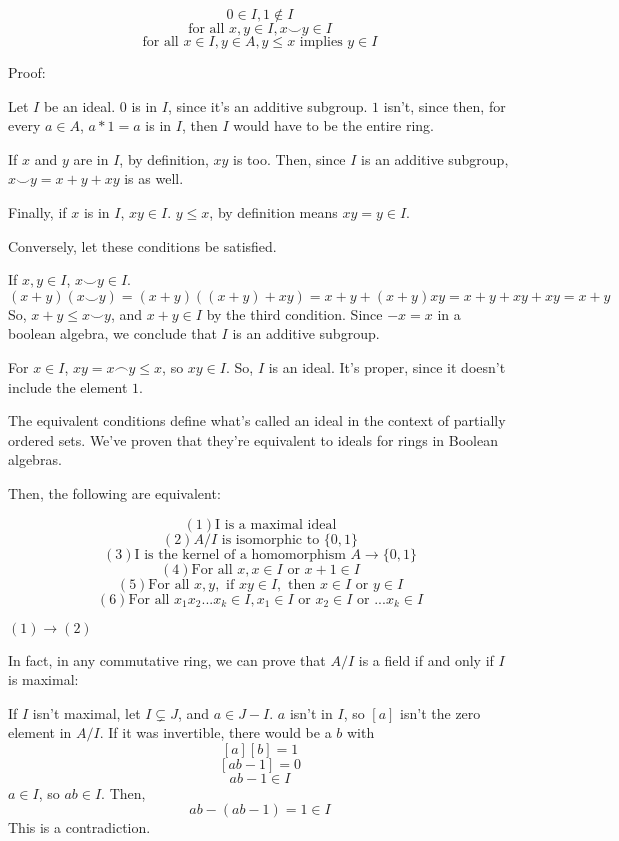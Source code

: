 \documentclass{article}
\begin{document}
      \[0 \in I, 1 \notin I\]
      \[\text{for all } x, y \in I, x \smile y \in I\]
      \[\text{for all } x \in I, y \in A, y \leq x \text{ implies } y \in I\]

      Proof:
      
      Let $I$ be an ideal. $0$ is in $I$, since it's an additive subgroup. $1$
      isn't, since then, for every $a \in A$, $a*1 = a$ is in $I$, then $I$
      would have to be the entire ring.

      If $x$ and $y$ are in $I$, by definition, $xy$ is too. Then, since $I$ is
      an additive subgroup, $x \smile y = x + y + xy$ is as well.

      Finally, if $x$ is in $I$, $xy \in I$. $y \leq x$, by definition means
      $xy = y \in I$.

      Conversely, let these conditions be satisfied.

      If $x, y \in I$, $x \smile y \in I$.
      \[(x+y)(x \smile y) = (x+y)((x+y)+xy) = x + y + (x+y)xy = x + y + xy + xy =
      x + y\]
      So, $x+y \leq x \smile y$, and $x+y \in I$ by the third condition. Since
      $-x = x$ in a boolean algebra, we conclude that $I$ is an additive
      subgroup.

      For $x \in I$, $xy = x \frown y \leq x$, so $xy \in I$. So, $I$ is an
      ideal. It's proper, since it doesn't include the element $1$.

      The equivalent conditions define what's called an ideal in the context of
      partially ordered sets. We've proven that they're equivalent to ideals for
      rings in Boolean algebras.

      Then, the following are equivalent:

      \[(1) \text{I is a maximal ideal}\]
      \[(2) A/I \text{ is isomorphic to } \{0,1\}\]
      \[(3) \text{I is the kernel of a homomorphism } A \rightarrow \{0,1\}\]
      \[(4) \text{For all } x, x \in I \text{ or } x+1 \in I\]
      \[(5) \text{For all } x,y, \text{ if } xy \in I, \text{ then } x \in I
      \text{ or } y \in I\]
      \[(6) \text{For all } x_1x_2...x_k \in I, x_1 \in I \text{ or } x_2 \in I
      \text{ or } ... x_k \in I\]

      $(1) \rightarrow (2)$

      In fact, in any commutative ring, we can prove that $A/I$ is a field if
      and only if $I$ is maximal:

      If $I$ isn't maximal, let $I \subsetneq J$, and $a \in J - I$. $a$ isn't
      in $I$, so $[a]$ isn't the zero element in $A/I$. If it was invertible,
      there would be a $b$ with
      \[[a][b] = 1\]
      \[[ab - 1] = 0\]
      \[ab - 1 \in I\]
      $a \in I$, so $ab \in I$. Then,
      \[ab - (ab - 1) = 1 \in I\]
      This is a contradiction.
\end{document}
